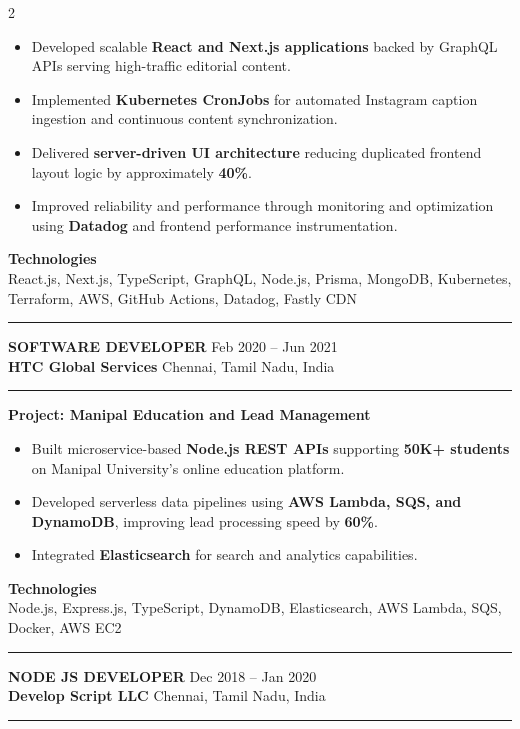 \documentclass[10pt,a4paper]{article}
\newcommand{\blockdivider}{\vspace{0pt}\color{rulecolor}\rule{\linewidth}{0.5pt}\color{primary}\vspace{4pt}}
\newcommand{\roleheader}[4]{%
  \noindent
  \textbf{\MakeUppercase{#3}}%
  \hfill
  \textcolor{secondary}{#4}\\[0pt]

  \noindent
  \textbf{#1}%
  \hfill
  \textcolor{secondary}{#2}\\[0pt]
}
\newcommand{\roledivider}{%
  \vspace{-1pt}%
  {\color{rulecolor}\rule{\linewidth}{0.5pt}}%
  \vspace{2pt}%
}
\newcommand{\projecttitle}[1]{\textbf{#1}\par\vspace{2pt}}
\begin{document}
\begin{paracol}{2}
\begin{itemize}
\item Developed scalable \textbf{React and Next.js applications} backed by GraphQL APIs serving high-traffic editorial content.

\item Implemented \textbf{Kubernetes CronJobs} for automated Instagram caption ingestion and continuous content synchronization.

\item Delivered \textbf{server-driven UI architecture} reducing duplicated frontend layout logic by approximately \textbf{40\%}.

\item Improved reliability and performance through monitoring and optimization using \textbf{Datadog} and frontend performance instrumentation.

\end{itemize}

\textbf{Technologies}\\
React.js, Next.js, TypeScript, GraphQL, Node.js, Prisma, MongoDB, Kubernetes, Terraform, AWS, GitHub Actions, Datadog, Fastly CDN

\blockdivider

\roleheader{HTC Global Services}{Chennai, Tamil Nadu, India}{Software Developer}{Feb 2020 -- Jun 2021}
\roledivider

\projecttitle{Project: Manipal Education and Lead Management}
\begin{itemize}

\item Built microservice-based \textbf{Node.js REST APIs} supporting \textbf{50K+ students} on Manipal University's online education platform.

\item Developed serverless data pipelines using \textbf{AWS Lambda, SQS, and DynamoDB}, improving lead processing speed by \textbf{60\%}.

\item Integrated \textbf{Elasticsearch} for search and analytics capabilities.

\end{itemize}

\textbf{Technologies}\\
Node.js, Express.js, TypeScript, DynamoDB, Elasticsearch, AWS Lambda, SQS, Docker, AWS EC2

\blockdivider

\roleheader{Develop Script LLC}{Chennai, Tamil Nadu, India}{Node JS Developer}{Dec 2018 -- Jan 2020}
\roledivider


\end{paracol}
\end{document}
